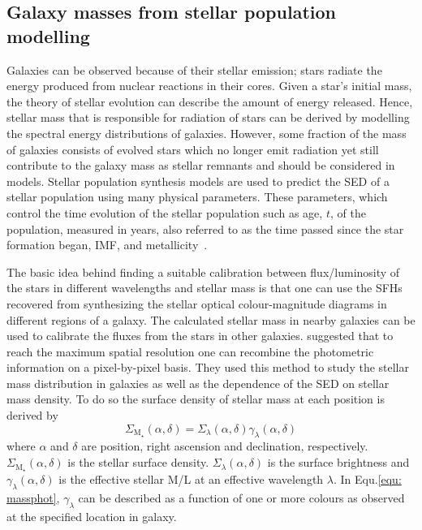 \subsection{Galaxy masses from stellar population modelling}

Galaxies can be observed because of their stellar emission; stars radiate the energy produced from nuclear reactions in their cores. 
Given a star's initial mass, the theory of stellar evolution can describe the amount of energy released. 
Hence, stellar mass that is responsible for radiation of stars can be derived by modelling the spectral energy distributions of galaxies. 
However, some fraction of the mass of galaxies consists of evolved stars which no longer emit radiation yet still contribute to the galaxy mass as stellar remnants and should be considered in models.
Stellar population synthesis models are used to predict the SED of a stellar population using many physical parameters. 
These parameters, which control the time evolution of the stellar population such as age, $t$, of the population, measured in years, also referred to as the time passed since the star formation began, IMF, and metallicity~\citep{Courteau13}.

The basic idea behind finding a suitable calibration between flux/luminosity of the stars in different wavelengths and stellar mass is that one can use the SFHs recovered from synthesizing the stellar optical colour-magnitude diagrams in different regions of a galaxy. 
The calculated stellar mass in nearby galaxies can be used to calibrate the fluxes from the stars in other galaxies.
\cite{Zibetti09} suggested that to reach the maximum spatial resolution one can recombine the photometric information on a pixel-by-pixel basis. 
They used this method to study the stellar mass distribution in galaxies as well as the dependence of the SED on stellar mass density.
To do so the surface density of stellar mass at each position is derived by 
\begin{equation}
\label{equ: massphot}
\Sigma_{{\mathrm M_\star}} (\alpha, \delta) = \Sigma_{\lambda}(\alpha, \delta) \gamma_{\lambda}(\alpha, \delta)
\end{equation}
where $\alpha$ and $\delta$ are position, right ascension and declination, respectively.
$\Sigma_{{\mathrm M_\star}} (\alpha, \delta)$ is the stellar surface density.
$\Sigma_{\lambda}(\alpha, \delta)$ is the surface brightness and $\gamma_{\lambda}(\alpha, \delta)$ is the effective stellar M/L at an effective wavelength $\lambda$.
In Equ.\ref{equ: massphot},  $\gamma_{\lambda}$ can be described as a function of one or more colours as observed at the specified location in galaxy. 

